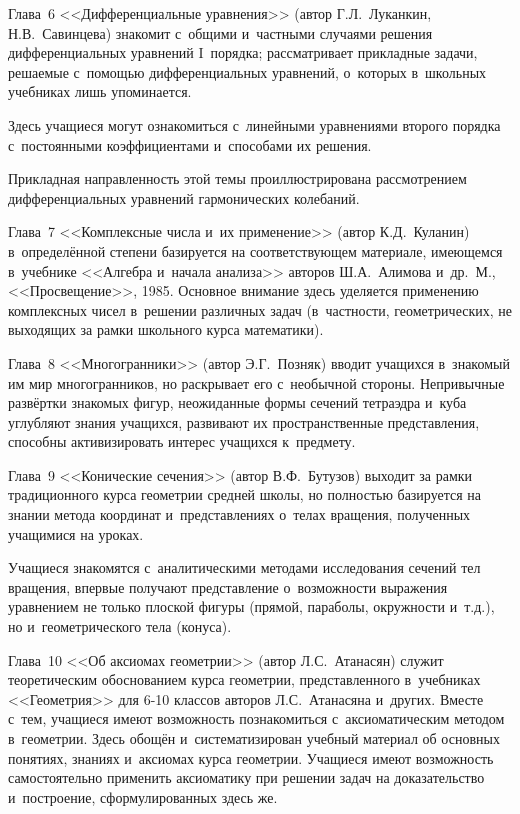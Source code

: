 Глава~6 <<Дифференциальные уравнения>> (автор Г.Л.~Луканкин, Н.В.~Савинцева)
знакомит с~общими и~частными случаями решения дифференциальных уравнений
I~порядка; рассматривает прикладные задачи, решаемые с~помощью
дифференциальных уравнений, о~которых в~школьных учебниках лишь упоминается.

Здесь учащиеся могут ознакомиться с~линейными уравнениями второго порядка
с~постоянными коэффициентами и~способами их решения.

Прикладная направленность этой темы проиллюстрирована рассмотрением
дифференциальных уравнений гармонических колебаний.

Глава~7 <<Комплексные числа и~их применение>> (автор К.Д.~Куланин)
в~определённой степени базируется на соответствующем материале,
имеющемся в~учебнике <<Алгебра и~начала анализа>> авторов Ш.А.~Алимова
и~др.\ М., <<Просвещение>>, 1985.
Основное внимание здесь уделяется применению комплексных чисел в~решении
различных задач (в~частности, геометрических, не выходящих за рамки
школьного курса математики).

Глава~8 <<Многогранники>> (автор Э.Г.~Позняк) вводит учащихся
в~знакомый им мир многогранников, но раскрывает его с~необычной стороны.
Непривычные развёртки знакомых фигур, неожиданные формы сечений тетраэдра
и~куба углубляют знания учащихся, развивают их пространственные представления,
способны активизировать интерес учащихся к~предмету.

Глава~9 <<Конические сечения>> (автор В.Ф.~Бутузов) выходит за рамки
традиционного курса геометрии средней школы, но полностью базируется
на знании метода координат и~представлениях о~телах вращения,
полученных учащимися на уроках.

Учащиеся знакомятся с~аналитическими методами исследования сечений тел вращения,
впервые получают представление о~возможности выражения уравнением не только
плоской фигуры (прямой, параболы, окружности и~т.д.),
но и~геометрического тела (конуса).

Глава~10 <<Об аксиомах геометрии>> (автор Л.С.~Атанасян) служит теоретическим
обоснованием курса геометрии, представленного в~учебниках <<Геометрия>>
для 6-10 классов авторов Л.С.~Атанасяна и~других. Вместе с~тем, учащиеся
имеют возможность познакомиться с~аксиоматическим методом в~геометрии.
Здесь обощён и~систематизирован учебный материал об основных понятиях,
знаниях и~аксиомах курса геометрии. Учащиеся имеют возможность
самостоятельно применить аксиоматику при решении задач на доказательство
и~построение, сформулированных здесь же.

